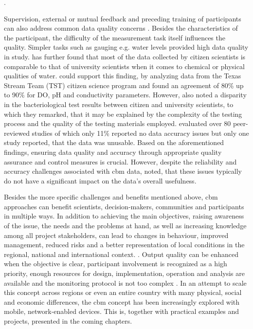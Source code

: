 {\autocite{fraislCitizenScienceEnvironmental2022,lackstromBackyardHydroclimatologyCitizen2022}.

Supervision, external or mutual feedback and preceding training of participants can also address common data quality concerns \autocite{albusAccuracyLongtermVolunteer2020,baalbakiCitizenScienceLebanon2019,fraislCitizenScienceEnvironmental2022}. Besides the characteristics of the participant, the difficulty of the measurement task itself influences the quality. Simpler tasks such as gauging e.g. water levels provided high data quality in \autocite{weeserCitizenSciencePioneers2018a} study. \autocite{baalbakiCitizenScienceLebanon2019} has further found that most of the data collected by citizen scientists is comparable to that of university scientists when it comes to chemical or physical qualities of water. \autocite{albusAccuracyLongtermVolunteer2020} could support this finding, by analyzing data from the Texas Stream Team (TST) citizen science program and found an agreement of 80\% up to 90\% for DO, pH and conductivity parameters. However, \autocite{baalbakiCitizenScienceLebanon2019} also noted a disparity in the bacteriological test results between citizen and university scientists, to which they remarked, that it may be explained by the complexity of the testing process and the quality of the testing materials employed. \autocite{aceves-buenoCitizenScienceApproach2015} evaluated over 80 peer-reviewed studies of which only 11\% reported no data accuracy issues but only one study reported, that the data was unusable. Based on the aforementioned findings, ensuring data quality and accuracy through appropriate quality assurance and control measures is crucial. However, despite the reliability and accuracy challenges associated with \acrshort*{cbm} data, \autocite{aceves-buenoCitizenScienceApproach2015} noted, that these issues typically do not have a significant impact on the data's overall usefulness.

Besides the more specific challenges and benefits mentioned above, \acrlong*{cbm} approaches can benefit scientists, decision-makers, communities and participants in multiple ways. In addition to achieving the main objectives, raising awareness of the issue, the needs and the problems at hand, as well as increasing knowledge among all project stakeholders, can lead to changes in behaviour, improved management, reduced risks and a better representation of local conditions in the regional, national and international context. \autocite{huangManagementDrinkingWater2020,walkerBenefitsNegativeImpacts2021}. Output quality can be enhanced when the objective is clear, participant involvement is recognized as a high priority, enough resources for design, implementation, operation and analysis are available and the monitoring protocol is not too complex \autocite{butteFrameworkWaterSecurity2022, pocockStrategicFrameworkSupport}. 
In an attempt to scale this concept across regions or even an entire country with many physical, social and economic differences, the \acrshort*{cbm} concept has been increasingly explored with mobile, network-enabled devices. This is, together with practical examples and projects, presented in the coming chapters.


}
